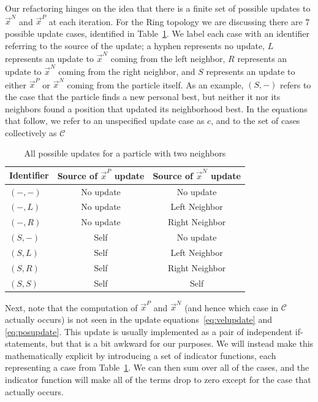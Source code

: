 \documentclass[journal,letterpaper]{IEEEtran}
\providecommand{\pers}{\ensuremath{P}}
\providecommand{\neigh}{\ensuremath{N}}
\providecommand{\leftind}{\ensuremath{L}}
\providecommand{\rightind}{\ensuremath{R}}
\providecommand{\nbest}{\ensuremath{\Vec{x}^\neigh}}
\providecommand{\pbest}{\ensuremath{\Vec{x}^\pers}}
\providecommand{\caseset}{\ensuremath{\mathcal{C}}}
\providecommand{\casegen}{\ensuremath{c}}
\providecommand{\casexn}{\ensuremath{(S,-)}}
\providecommand{\casexx}{\ensuremath{(S,S)}}
\providecommand{\casexl}{\ensuremath{(S,\leftind)}}
\providecommand{\casexr}{\ensuremath{(S,\rightind)}}
\providecommand{\casepn}{\ensuremath{(-,-)}}
\providecommand{\casepl}{\ensuremath{(-,\leftind)}}
\providecommand{\casepr}{\ensuremath{(-,\rightind)}}
\begin{document}
Our refactoring hinges on the idea that there is a finite set of possible
updates to $\nbest$ and $\pbest$ at each iteration.  For the Ring topology we
are discussing there are 7 possible update cases, identified in
Table~\ref{tab:evals}.  We label each case with an identifier referring to the
source of the update; a hyphen represents no update, $L$ represents an update
to $\nbest$ coming from the left neighbor, $R$ represents an update to $\nbest$
coming from the right neighbor, and $S$ represents an update to either $\pbest$
or $\nbest$ coming from the particle itself.  As an example, $\casexn$ refers
to the case that the particle finds a new personal best, but neither it nor its
neighbors found a position that updated its neighborhood best.  In the
equations that follow, we refer to an unspecified update case as $\casegen$,
and to the set of cases collectively as $\caseset$

\begin{table}
  \caption{All possible updates for a particle with two neighbors}
  \label{tab:evals}
  \centering
  \begin{tabular}{lcc}
	Identifier&Source of $\pbest$ update&Source of $\nbest$ update\\
	\hline
	\hline
	$\casepn$&No update&No update\\
	\hline
	$\casepl$&No update&Left Neighbor\\
	\hline
	$\casepr$&No update&Right Neighbor\\
	\hline
	$\casexn$&Self&No update\\
	\hline
	$\casexl$&Self&Left Neighbor\\
	\hline
	$\casexr$&Self&Right Neighbor\\
	\hline
	$\casexx$&Self&Self\\
	\hline
  \end{tabular}
\end{table}

Next, note that the computation of $\pbest$ and $\nbest$ (and hence which case
in $\caseset$ actually occurs) is not seen in the update
equations~\eqref{eq:velupdate} and \eqref{eq:posupdate}.  This update is
usually implemented as a pair of independent if-statements, but that is a bit
awkward for our purposes.  We will instead make this mathematically explicit by
introducing a set of indicator functions, each representing a case from
Table~\ref{tab:evals}.  We can then sum over all of the cases, and the
indicator function will make all of the terms drop to zero except for the case
that actually occurs.
\end{document}
